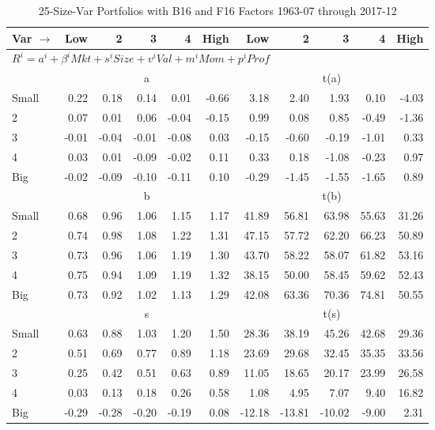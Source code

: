 
\begin{table}[!ht]
\footnotesize
\centering
\caption{25-Size-Var Portfolios with B16 and F16 Factors
1963-07 through 2017-12}
\begin{tabular}{lrrrrrrrrrr}
  \toprule
    
    Var $\rightarrow$ & Low & 2 & 3 & 4 & High & Low & 2 & 3 & 4 & High  \\ 
  \midrule
  \multicolumn{11}{l}{$R^i=a^i+\beta^iMkt+s^iSize+v^iVal+m^iMom+p^iProf$}  \\
  
     & \multicolumn{5}{c}{a} & \multicolumn{5}{c}{t(a)}   \\
     \cmidrule(r){2-6} \cmidrule(r){7-11} 
    Small  & 0.22  & 0.18  & 0.14  & 0.01  & -0.66  & 3.18  & 2.40  & 1.93  & 0.10  & -4.03   \\
    2  & 0.07  & 0.01  & 0.06  & -0.04  & -0.15  & 0.99  & 0.08  & 0.85  & -0.49  & -1.36   \\
    3  & -0.01  & -0.04  & -0.01  & -0.08  & 0.03  & -0.15  & -0.60  & -0.19  & -1.01  & 0.33   \\
    4  & 0.03  & 0.01  & -0.09  & -0.02  & 0.11  & 0.33  & 0.18  & -1.08  & -0.23  & 0.97   \\
    Big  & -0.02  & -0.09  & -0.10  & -0.11  & 0.10  & -0.29  & -1.45  & -1.55  & -1.65  & 0.89   \\
    
  
     & \multicolumn{5}{c}{b} & \multicolumn{5}{c}{t(b)}   \\
     \cmidrule(r){2-6} \cmidrule(r){7-11} 
    Small  & 0.68  & 0.96  & 1.06  & 1.15  & 1.17  & 41.89  & 56.81  & 63.98  & 55.63  & 31.26   \\
    2  & 0.74  & 0.98  & 1.08  & 1.22  & 1.31  & 47.15  & 57.72  & 62.20  & 66.23  & 50.89   \\
    3  & 0.73  & 0.96  & 1.06  & 1.19  & 1.30  & 43.70  & 58.22  & 58.07  & 61.82  & 53.16   \\
    4  & 0.75  & 0.94  & 1.09  & 1.19  & 1.32  & 38.15  & 50.00  & 58.45  & 59.62  & 52.43   \\
    Big  & 0.73  & 0.92  & 1.02  & 1.13  & 1.29  & 42.08  & 63.36  & 70.36  & 74.81  & 50.55   \\
    
  
     & \multicolumn{5}{c}{s} & \multicolumn{5}{c}{t(s)}   \\
     \cmidrule(r){2-6} \cmidrule(r){7-11} 
    Small  & 0.63  & 0.88  & 1.03  & 1.20  & 1.50  & 28.36  & 38.19  & 45.26  & 42.68  & 29.36   \\
    2  & 0.51  & 0.69  & 0.77  & 0.89  & 1.18  & 23.69  & 29.68  & 32.45  & 35.35  & 33.56   \\
    3  & 0.25  & 0.42  & 0.51  & 0.63  & 0.89  & 11.05  & 18.65  & 20.17  & 23.99  & 26.58   \\
    4  & 0.03  & 0.13  & 0.18  & 0.26  & 0.58  & 1.08  & 4.95  & 7.07  & 9.40  & 16.82   \\
    Big  & -0.29  & -0.28  & -0.20  & -0.19  & 0.08  & -12.18  & -13.81  & -10.02  & -9.00  & 2.31   \\
    

\end{tabular}
\end{table}
